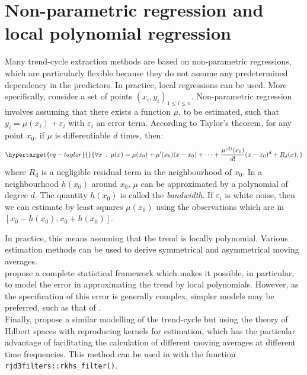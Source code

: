 \documentclass[
]{article}
\newcommand\1{\mathds{1}}
\begin{document}
\hypertarget{sec-nonparamreg}{%
\section{Non-parametric regression and local polynomial
regression}\label{sec-nonparamreg}}

Many trend-cycle extraction methods are based on non-parametric
regressions, which are particularly flexible because they do not assume
any predetermined dependency in the predictors. In practice, local
regressions can be used. More specifically, consider a set of points
\((x_i,y_i)_{1\leq i\leq n}\). Non-parametric regression involves
assuming that there exists a function \(\mu\), to be estimated, such
that \(y_i=\mu(x_i)+\varepsilon_i\) with \(\varepsilon_i\) an error
term. According to Taylor's theorem, for any point \(x_0\), if \(\mu\)
is differentiable \(d\) times, then:
\begin{equation}\protect\hypertarget{eq-taylor}{}{
\forall x \::\:\mu(x) = \mu(x_0) + \mu'(x_0)(x-x_0)+\dots +
\frac{\mu^{(d)}(x_0)}{d!}(x-x_0)^d+R_d(x),
}\label{eq-taylor}\end{equation} where \(R_d\) is a negligible residual
term in the neighbourhood of \(x_0\). In a neighbourhood \(h(x_0)\)
around \(x_0\), \(\mu\) can be approximated by a polynomial of degree
\(d\). The quantity \(h(x_0)\) is called the \emph{bandwidth}. If
\(\varepsilon_i\) is white noise, then we can estimate by least squares
\(\mu(x_0)\) using the observations which are in
\(\left[x_0-h(x_0),x_0+h(x_0)\right]\).

In practice, this means assuming that the trend is locally polynomial.
Various estimation methods can be used to derive symmetrical and
asymmetrical moving averages.\\
\textcite{GrayThomson1996} propose a complete statistical framework
which makes it possible, in particular, to model the error in
approximating the trend by local polynomials. However, as the
specification of this error is generally complex, simpler models may be
preferred, such as that of \textcite{proietti2008}.\\
Finally, \textcite{dagumbianconcini2008} propose a similar modelling of
the trend-cycle but using the theory of Hilbert spaces with reproducing
kernels for estimation, which has the particular advantage of
facilitating the calculation of different moving averages at different
time frequencies. This method can be used in with the
function \texttt{rjd3filters::rkhs\_filter()}.
\end{document}
